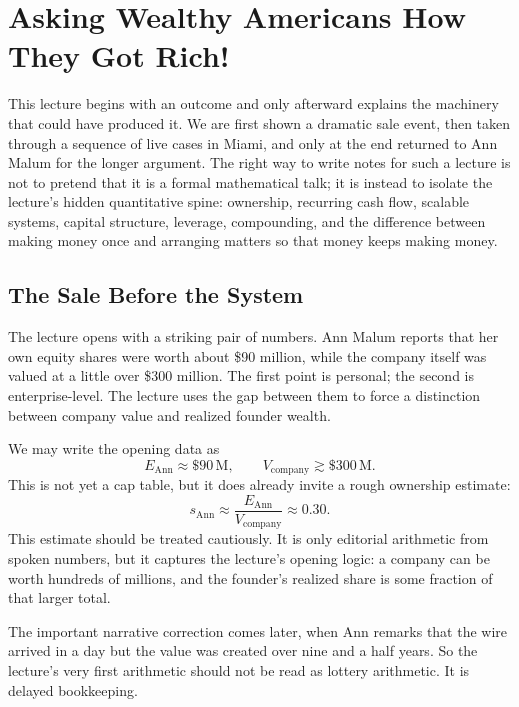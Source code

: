 \chapter{Asking Wealthy Americans How They Got Rich!}

This lecture begins with an outcome and only afterward explains the machinery that could have produced it. We are first shown a dramatic sale event, then taken through a sequence of live cases in Miami, and only at the end returned to Ann Malum for the longer argument. The right way to write notes for such a lecture is not to pretend that it is a formal mathematical talk; it is instead to isolate the lecture's hidden quantitative spine: ownership, recurring cash flow, scalable systems, capital structure, leverage, compounding, and the difference between making money once and arranging matters so that money keeps making money.

\section{The Sale Before the System}

The lecture opens with a striking pair of numbers. Ann Malum reports that her own equity shares were worth about \$90 million, while the company itself was valued at a little over \$300 million. The first point is personal; the second is enterprise-level. The lecture uses the gap between them to force a distinction between company value and realized founder wealth.

We may write the opening data as
\begin{equation}
E_{\mathrm{Ann}} \approx \$90\,\mathrm{M},
\qquad
V_{\mathrm{company}} \gtrsim \$300\,\mathrm{M}.
\end{equation}
This is not yet a cap table, but it does already invite a rough ownership estimate:
\begin{equation}
s_{\mathrm{Ann}} \approx \frac{E_{\mathrm{Ann}}}{V_{\mathrm{company}}} \approx 0.30.
\end{equation}
This estimate should be treated cautiously. It is only editorial arithmetic from spoken numbers, but it captures the lecture's opening logic: a company can be worth hundreds of millions, and the founder's realized share is some fraction of that larger total.

The important narrative correction comes later, when Ann remarks that the wire arrived in a day but the value was created over nine and a half years. So the lecture's very first arithmetic should not be read as lottery arithmetic. It is delayed bookkeeping.

